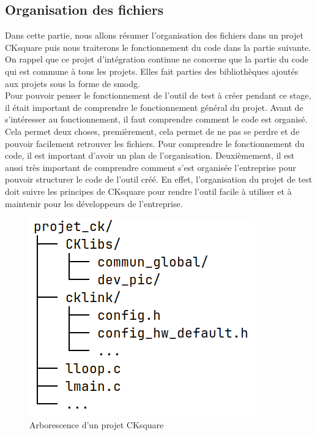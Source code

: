\documentclass[a4paper]{article}
\begin{document}
\subsection{Organisation des fichiers}
\label{orgaprojck}

Dans cette partie, nous allons résumer l'organisation des fichiers dans un
projet CKsquare puis nous traiterons le fonctionnement du code dans la partie
suivante. On rappel que ce projet d'intégration continue ne concerne que la
partie du code qui est commune à tous les projets. Elles fait parties des
bibliothèques ajoutés aux projets sous la forme de \gls{smodg}. \\

Pour pouvoir penser le fonctionnement de l'outil de test à créer pendant ce
stage, il était important de comprendre le fonctionnement général du projet.
Avant de s'intéresser au fonctionnement, il faut comprendre comment le code est
organisé. Cela permet deux choses, premièrement, cela permet de ne pas se perdre
et de pouvoir facilement retrouver les fichiers. Pour comprendre le
fonctionnement du code, il est important d'avoir un plan de l'organisation.
Deuxièmement, il est aussi très important de comprendre comment s'est organisée
l'entreprise pour pouvoir structurer le code de l'outil créé. En
effet, l'organisation du projet de test doit suivre les principes de CKsquare
pour rendre l'outil facile à utiliser et à maintenir pour les développeurs de
l'entreprise.

\begin{figure}[h!]
  \begin{center}
    \includegraphics[scale=0.5]{./img/arborescence-proj.png}
    \caption{Arborescence d'un projet CKsquare}
    \label{fig:arbrprojck}
  \end{center}
\end{figure}
\end{document}
